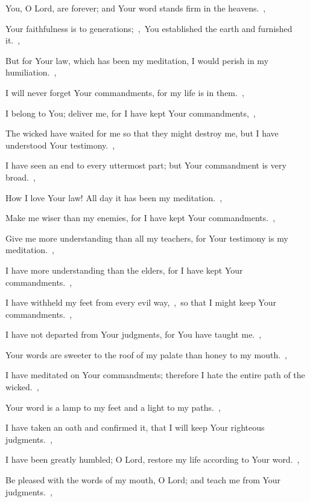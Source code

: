 \documentclass[12pt,twoside,a5paper]{article}
\begin{document}

\begin{halfparskip}
    You, O Lord, are forever; and Your word stands firm in the heavens.~\sep


  Your faithfulness is to generations;~\sep\ You established the earth and furnished it.~\sep

  But for Your law, which has been my meditation, I would perish in my humiliation.~\sep

  I will never forget Your commandments, for my life is in them.~\sep

  I belong to You; deliver me, for I have kept Your commandments,~\sep

  The wicked have waited for me so that they might destroy me, but I have understood Your testimony.~\sep

  I have seen an end to every uttermost part; but Your commandment is very broad.~\sep

   How I love Your law! All day it has been my meditation.~\sep

  Make me wiser than my enemies, for I have kept Your commandments.~\sep

  Give me more understanding than all my teachers, for Your testimony is my meditation.~\sep

  I have more understanding than the elders, for I have kept Your commandments.~\sep

  I have withheld my feet from every evil way,~\sep\ so that I might keep Your commandments.~\sep

  I have not departed from Your judgments, for You have taught me.~\sep

  Your words are sweeter to the roof of my palate than honey to my mouth.~\sep

  I have meditated on Your commandments; therefore I hate the entire path of the wicked.~\sep

   Your word is a lamp to my feet and a light to my paths.~\sep

  I have taken an oath and confirmed it, that I will keep Your righteous judgments.~\sep

  I have been greatly humbled; O Lord, restore my life according to Your word.~\sep

  Be pleased with the words of my mouth, O Lord; and teach me from Your judgments.~\sep


\end{halfparskip}
\end{document}
